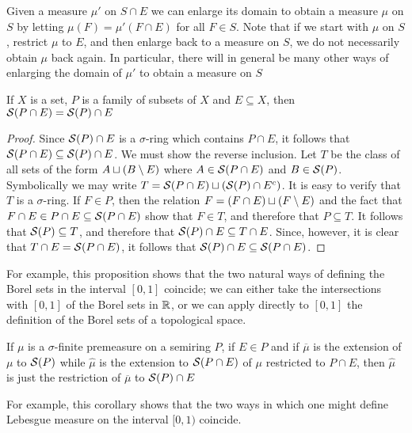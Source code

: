 Given a measure $\mu'$ on $S \cap E$ we can enlarge its domain to obtain a measure $\mu$ on $S$ by letting $\mu(F)=\mu'(F \cap E)$ for all $F \in S$. Note that if we start with $\mu$ on $S$, restrict $\mu$ to $E$, and then enlarge back to a measure on $S$, we do not necessarily obtain $\mu$ back again. In particular, there will in general be many other ways of enlarging the domain of $\mu'$ to obtain a measure on $S$

\begin{proposition}
\label{prop:sring generated by intersection}
If $X$ is a set, $P$ is a family of subsets of $X$ and $E \subseteq X$, then ${\cal S}(P \cap E)={\cal S}(P) \cap E$
\end{proposition}


\begin{proof}
Since ${\cal S}(P) \cap E$ is a $\sigma$-ring which contains $P \cap E$, it follows that ${\cal S}(P \cap E) \subseteq {\cal S}(P) \cap E$. We must show the reverse inclusion. Let $T$ be the class of all sets of the form $A\sqcup(B\setminus E)$ where $A \in {\cal S}(P \cap E)$ and $B \in {\cal S}(P)$. Symbolically we may write $T={\cal S}(P \cap E)\sqcup({\cal S}(P)\cap{E}^c)$. It is easy to verify that $T$ is a $\sigma$-ring. If $F \in P$, then the relation $F=(F \cap E) \sqcup(F\setminus E)$ and the fact that $F \cap E\in P\cap E\subseteq {\cal S}(P \cap E)$ show that $F \in T$, and therefore that $P \subseteq T$. It follows that ${\cal S}(P) \subseteq T$, and therefore that ${\cal S}(P) \cap E\subseteq T\cap E$. Since, however, it is clear that $T \cap E={\cal S}(P \cap E)$, it follows that ${\cal S}(P) \cap E\subseteq {\cal S}(P \cap E)$.
\end{proof}

For example, this proposition shows that the two natural ways of defining the Borel sets in the interval $[0,1]$ coincide; we can either take the intersections with $[0,1]$ of the Borel sets in $\mathbb{R}$, or we can apply directly to $[0,1]$ the definition of the Borel sets of a topological space.

\begin{corollary}
If $\mu$ is a $\sigma$-finite premeasure on a semiring $P$, if $E \in P$ and if $\overline{\mu}$ is the extension of $\mu$ to ${\cal S}(P)$ while $\widehat{\mu}$ is the extension to ${\cal S}(P \cap E)$ of $\mu$ restricted to $P \cap E$, then $\widehat{\mu}$ is just the restriction of $\overline{\mu}$ to ${\cal S}(P) \cap E$
\end{corollary}

For example, this corollary shows that the two ways in which one might define Lebesgue measure on the interval $[0, 1)$ coincide.

